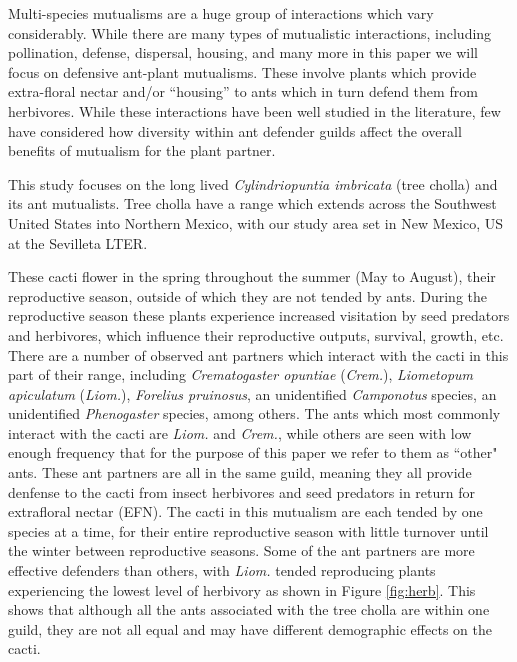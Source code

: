 \documentclass[12pt,a4paper]{article}
\begin{document}
Multi-species mutualisms are a huge group of interactions which vary considerably. 
While there are many types of mutualistic interactions, including pollination, defense, dispersal, housing, and many more\cite{Bronstein2006} in this paper we will focus on defensive ant-plant mutualisms.
These involve plants which provide extra-floral nectar and/or ``housing'' to ants which in turn defend them from herbivores\cite{Bronstein1998}. 
While these interactions have been well studied\cite{} in the literature, few have considered how diversity within ant defender guilds affect the overall benefits of mutualism for the plant partner. 

This study focuses on the long lived \textit{Cylindriopuntia imbricata} (tree cholla) and its ant mutualists. 
Tree cholla have a range which extends across the Southwest United States into Northern Mexico, with our study area set in New Mexico, US at the Sevilleta LTER.

These cacti flower in the spring throughout the summer (May to August), their reproductive season, outside of which they are not tended by ants. 
During the reproductive season these plants experience increased visitation by seed predators and herbivores, which influence their reproductive outputs, survival, growth, etc.
There are a number of observed ant partners which interact with the cacti in this part of their range, including \textit{Crematogaster opuntiae} (\textit{Crem.}), \textit{Liometopum apiculatum} (\textit{Liom.}), \textit{Forelius pruinosus}, an unidentified \textit{Camponotus} species, an unidentified \textit{Phenogaster} species, among others. 
The ants which most commonly interact with the cacti are \textit{Liom.} and \textit{Crem.}, while others are seen with low enough frequency that for the purpose of this paper we refer to them as ``other" ants. 
These ant partners are all in the same guild, meaning they all provide denfense to the cacti from insect herbivores and seed predators in return for extrafloral nectar (EFN).
The cacti in this mutualism are each tended by one species at a time, for their entire reproductive season with little turnover until the winter between reproductive seasons. 
Some of the ant partners are more effective defenders than others, with \textit{Liom.} tended reproducing plants experiencing the lowest level of herbivory as shown in Figure \ref{fig:herb}.
This shows that although all the ants associated with the tree cholla are within one guild, they are not all equal and may have different demographic effects on the cacti.
\end{document}
